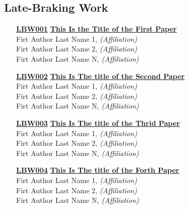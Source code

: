 \subsection{Late-Braking Work}
\begin{enumerate}
\item[\href{https://doi.org/10.1145/1122445.1122456}{\textbf{LBW001}}]
\href{https://doi.org/10.1145/1122445.1122456}{\textbf{This Is the Title of the First Paper}}\\
Firt Author Last Name 1, \emph{(Affiliation)}\\
Firt Author Last Name 2, \emph{(Affiliation)}\\
Firt Author Last Name N, \emph{(Affiliation)}\\

\item[\href{https://doi.org/10.1145/1122445.1122456}{\textbf{LBW002}}]
\href{https://doi.org/10.1145/1122445.1122456}{\textbf{This Is The title of the Second Paper}}\\
Firt Author Last Name 1, \emph{(Affiliation)}\\
Firt Author Last Name 2, \emph{(Affiliation)}\\
Firt Author Last Name N, \emph{(Affiliation)}\\

\item[\href{https://doi.org/10.1145/1122445.1122456}{\textbf{LBW003}}]
\href{https://doi.org/10.1145/1122445.1122456}{\textbf{This Is The title of the Thrid Paper}}\\
Firt Author Last Name 1, \emph{(Affiliation)}\\
Firt Author Last Name 2, \emph{(Affiliation)}\\
Firt Author Last Name N, \emph{(Affiliation)}\\

\item[\href{https://doi.org/10.1145/1122445.1122456}{\textbf{LBW004}}]
\href{https://doi.org/10.1145/1122445.1122456}{\textbf{This Is The title of the Forth Paper}}\\
Firt Author Last Name 1, \emph{(Affiliation)}\\
Firt Author Last Name 2, \emph{(Affiliation)}\\
Firt Author Last Name N, \emph{(Affiliation)}\\
\end{enumerate}



